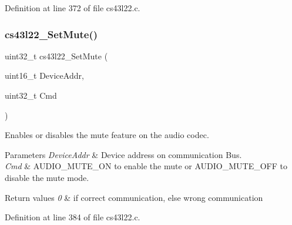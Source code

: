 Definition at line 372 of file cs43l22.\+c.

\mbox{\label{group___c_s43_l22___private___functions_gaed17c2b64d79830afa43b5a45b159286}} 
\subsubsection{\texorpdfstring{cs43l22\+\_\+\+Set\+Mute()}{cs43l22\_SetMute()}}
{\footnotesize\ttfamily uint32\+\_\+t cs43l22\+\_\+\+Set\+Mute (\begin{DoxyParamCaption}\item[{uint16\+\_\+t}]{Device\+Addr,  }\item[{uint32\+\_\+t}]{Cmd }\end{DoxyParamCaption})}



Enables or disables the mute feature on the audio codec. 


\begin{DoxyParams}{Parameters}
{\em Device\+Addr} & Device address on communication Bus. ~\newline
\\
\hline
{\em Cmd} & A\+U\+D\+I\+O\+\_\+\+M\+U\+T\+E\+\_\+\+ON to enable the mute or A\+U\+D\+I\+O\+\_\+\+M\+U\+T\+E\+\_\+\+O\+FF to disable the mute mode. \\
\hline
\end{DoxyParams}

\begin{DoxyRetVals}{Return values}
{\em 0} & if correct communication, else wrong communication \\
\hline
\end{DoxyRetVals}


Definition at line 384 of file cs43l22.\+c.

\mbox{\label{group___c_s43_l22___private___functions_gaad55b2ed28b599b34f4bfe50df745f0d}} 
